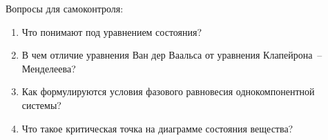 Вопросы для самоконтроля:
\begin{enumerate}
\item Что понимают под уравнением состояния?
\item В чем отличие уравнения Ван дер Ваальса от уравнения Клапейрона~-- Менделеева?
\item Как формулируются условия фазового равновесия однокомпонентной системы?
\item Что такое критическая точка на диаграмме состояния вещества?
\end{enumerate}